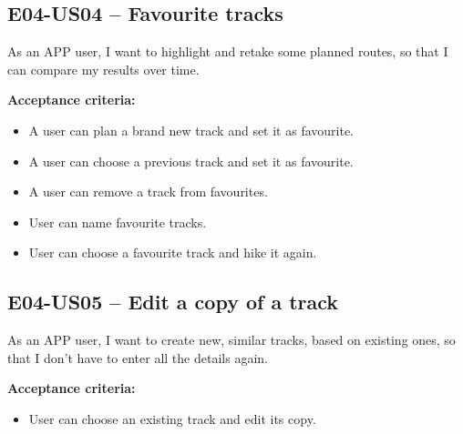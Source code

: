 \subsection*{E04-US04 -- Favourite tracks}
As an APP user, I want to highlight and retake some planned routes, so that I can compare my results over time.

\textbf{Acceptance criteria:}
\begin{itemize}
    \item A user can plan a brand new track and set it as favourite.
    \item A user can choose a previous track and set it as favourite.
    \item A user can remove a track from favourites.
    \item User can name favourite tracks.
    \item User can choose a favourite track and hike it again.
\end{itemize}

\subsection*{E04-US05 -- Edit a copy of a track}
As an APP user, I want to create new, similar tracks, based on existing ones, so that I don't have to enter all the details again.

\textbf{Acceptance criteria:}
\begin{itemize}
    \item User can choose an existing track and edit its copy.
\end{itemize}
